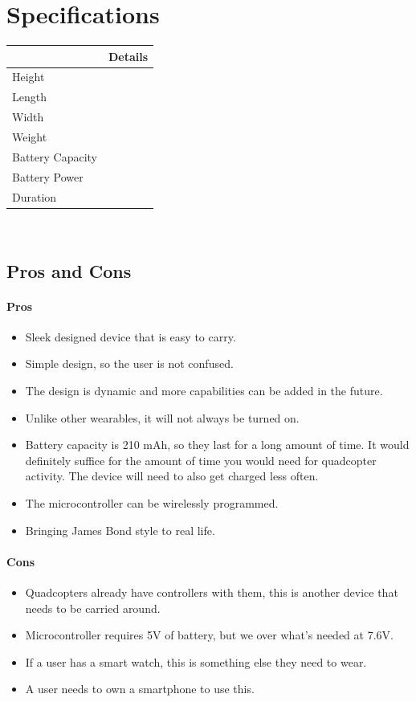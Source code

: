 \documentclass[12pt,letterpaper]{article}
\begin{document}
\section*{Specifications}
\begin{tabular}{| l | l |}
	 \hline
	 & Details \\ \hline
	Height &  \\ %
	Length &  \\ %
	Width &  \\ %
	Weight &  \\ %
	Battery Capacity &  \\ %
	Battery Power &  \\ %
	Duration &  \\ \hline
\end{tabular} \\

\subsection*{Pros and Cons}
\paragraph{Pros}
\begin{itemize}
	\item Sleek designed device that is easy to carry.
	\item Simple design, so the user is not confused.
	\item The design is dynamic and more capabilities can be added in the future.
	\item Unlike other wearables, it will not always be turned on.
	\item Battery capacity is 210 mAh, so they last for a long amount of time. It would definitely suffice for the amount of time you would need for quadcopter activity. The device will need to also get charged less often.
	\item The microcontroller can be wirelessly programmed.
	\item Bringing James Bond style to real life.
\end{itemize}

\paragraph{Cons}
\begin{itemize}
	\item Quadcopters already have controllers with them, this is another device that needs to be carried around.
	\item Microcontroller requires 5V of battery, but we over what's needed at 7.6V.
	\item If a user has a smart watch,  this is something else they need to wear.
	\item A user needs to own a smartphone to use this.
\end{itemize}
\end{document}
